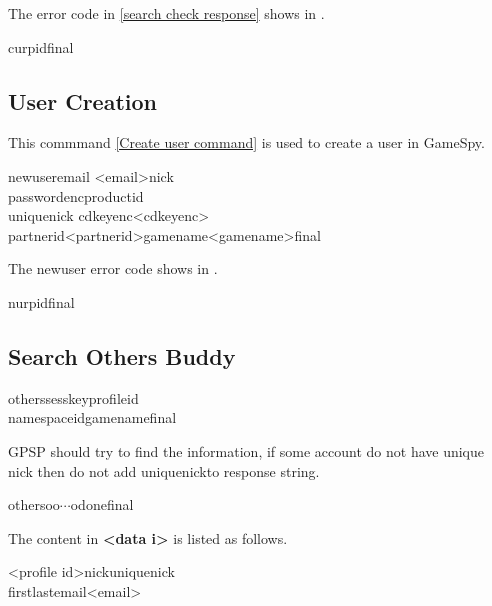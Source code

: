 \documentclass[oneside,titlepage,a4paper]{Definition/retrospy} %
\begin{document}
\ServerResponse
The error code in \ref{search check response} shows in .
\begin{mybox}[label = search check response]
	\tbs cur\tbs<check error code>\tbs pid\tbs <profile id>\tbs final\tbs
\end{mybox}

\subsection{User Creation}
This commmand \ref{Create user command} is used to create a user in GameSpy.
\ClientRequest

\begin{mybox}[label = Create user command]
\tbs newuser\tbs email \tbs <email>\tbs nick \\
\tbs passwordenc\tbs productid\\\tbs uniquenick
\tbs cdkeyenc\tbs <cdkeyenc>\\\tbs partnerid\tbs <partnerid>\tbs gamename\tbs <gamename>\tbs final\tbs
\end{mybox}

\ServerResponse
The newuser error code shows in .
\begin{mybox}
	\tbs nur\tbs<newuser error code>\tbs pid\tbs <profile id>\tbs final\tbs
\end{mybox}

\subsection{Search Others Buddy}
\ClientRequest

\begin{mybox}
	\tbs others\tbs\tbs sesskey\tbs<session key>\tbs profileid\tbs<profile id>\\\tbs namespaceid\tbs <namespace id>\tbs gamename\tbs<game name>\tbs final\tbs
\end{mybox}
\ServerResponse
GPSP should try to find the information, if some account do not have unique nick then do not add \tbs uniquenick\tbs to response string.
\begin{mybox}
\tbs others\tbs\tbs o\tbs o\tbs $\cdots$\tbs odone\tbs final\tbs
\end{mybox}
The content in \textbf{<data i>} is listed as follows.
\begin{mybox}
	<profile id>\tbs nick\tbs <nick name>\tbs uniquenick\tbs<unique nick>\\\tbs first\tbs<first name>\tbs last\tbs <last name>\tbs email\tbs<email>
\end{mybox}
\end{document}

